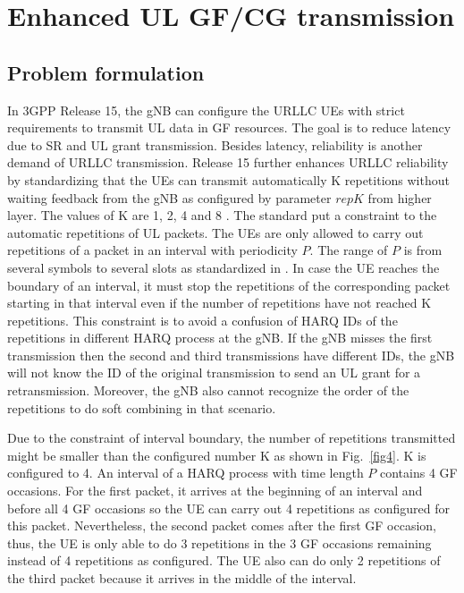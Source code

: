 \documentclass{ieeeaccess}
\begin{document}
\section{Enhanced UL GF/CG transmission}\label{III}
\subsection{Problem formulation}

In 3GPP Release 15, the gNB can configure the URLLC UEs with strict requirements to transmit UL data in GF resources. The goal is to reduce latency due to SR and UL grant transmission. Besides latency, reliability is another demand of URLLC transmission. Release 15 further enhances URLLC reliability by standardizing that the UEs can transmit automatically K repetitions without waiting feedback from the gNB as configured by parameter $repK$ from higher layer. The values of K are 1, 2, 4 and 8 \cite{ref6}.
The standard put a constraint to the automatic repetitions of UL packets. The UEs are only allowed to carry out repetitions of a packet in an interval with periodicity $P$. The range of $P$ is from several symbols to several slots as standardized in \cite{ref6}. In case the UE reaches the boundary of an interval, it must stop the repetitions of the corresponding packet starting in that interval even if the number of repetitions have not reached K repetitions. This constraint is to avoid a confusion of HARQ IDs of the repetitions in different HARQ process at the gNB. If the gNB misses the first transmission then the second and third transmissions have different IDs, the gNB will not know the ID of the original transmission to send an UL grant for a retransmission. Moreover, the gNB also cannot recognize the order of the repetitions to do soft combining in that scenario. 

Due to the constraint of interval boundary, the number of repetitions transmitted might be smaller than the configured number K as shown in Fig.~\ref{fig4}. K is configured to 4. An interval of a HARQ process with time length $P$ contains 4 GF occasions. For the first packet, it arrives at the beginning of an interval and before all 4 GF occasions so the UE can carry out 4 repetitions as configured for this packet. Nevertheless, the second packet comes after the first GF occasion, thus, the UE is only able to do 3 repetitions in the 3 GF occasions remaining instead of 4 repetitions as configured. The UE also can do only 2 repetitions of the third packet because it arrives in the middle of the interval. 
\end{document}

